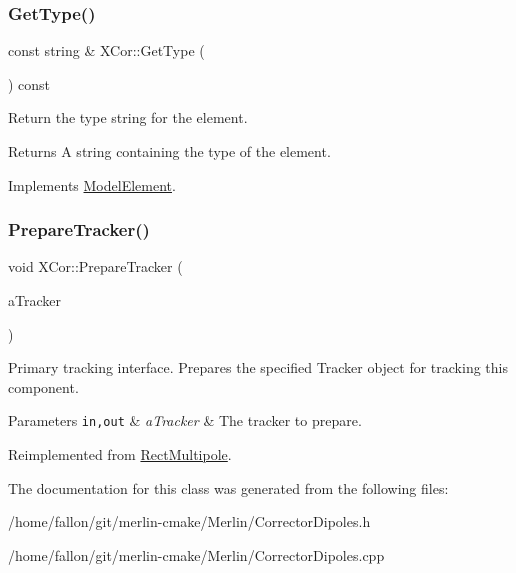 \mbox{\label{classXCor_a7b8f33e0c46765aaf030ddc24dcdd91b}} 
\subsubsection{\texorpdfstring{Get\+Type()}{GetType()}}
{\footnotesize\ttfamily const string \& X\+Cor\+::\+Get\+Type (\begin{DoxyParamCaption}{ }\end{DoxyParamCaption}) const\hspace{0.3cm}{\ttfamily [virtual]}}

Return the type string for the element. \begin{DoxyReturn}{Returns}
A string containing the type of the element. 
\end{DoxyReturn}


Implements \hyperlink{classModelElement_a04dc2e51e1999fca612eb1838ec6b271}{Model\+Element}.

\mbox{\label{classXCor_abd5e017ea4191ee86f141d72979f90d2}} 
\subsubsection{\texorpdfstring{Prepare\+Tracker()}{PrepareTracker()}}
{\footnotesize\ttfamily void X\+Cor\+::\+Prepare\+Tracker (\begin{DoxyParamCaption}\item[{\hyperlink{classComponentTracker}{Component\+Tracker} \&}]{a\+Tracker }\end{DoxyParamCaption})\hspace{0.3cm}{\ttfamily [virtual]}}

Primary tracking interface. Prepares the specified Tracker object for tracking this component. 
\begin{DoxyParams}[1]{Parameters}
\mbox{\tt in,out}  & {\em a\+Tracker} & The tracker to prepare. \\
\hline
\end{DoxyParams}


Reimplemented from \hyperlink{classRectMultipole_a2626d08254eee03cffb73abb20a9381a}{Rect\+Multipole}.



The documentation for this class was generated from the following files\+:\begin{DoxyCompactItemize}
\item 
/home/fallon/git/merlin-\/cmake/\+Merlin/Corrector\+Dipoles.\+h\item 
/home/fallon/git/merlin-\/cmake/\+Merlin/Corrector\+Dipoles.\+cpp\end{DoxyCompactItemize}
